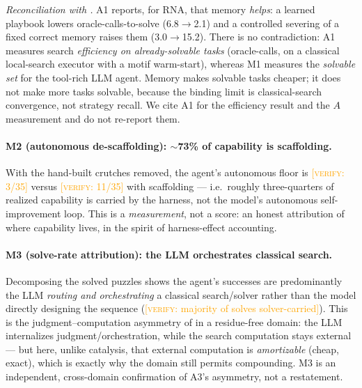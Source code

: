 \documentclass[11pt]{article}
\newcommand{\verify}[1]{\textcolor{orange}{[\textsc{verify}: #1]}}
\begin{document}
\emph{Reconciliation with \citet{actuation}.} A1 reports, for RNA, that memory \emph{helps}: a
learned playbook lowers oracle-calls-to-solve (6.8$\to$2.1) and a controlled severing of a fixed
correct memory raises them (3.0$\to$15.2). There is no contradiction: A1 measures search
\emph{efficiency on already-solvable tasks} (oracle-calls, on a classical local-search executor with a
motif warm-start), whereas M1 measures the \emph{solvable set} for the tool-rich LLM agent. Memory
makes solvable tasks cheaper; it does not make more tasks solvable, because the binding limit is
classical-search convergence, not strategy recall. We cite A1 for the efficiency result and the $A$
measurement and do not re-report them.

\paragraph{M2 (autonomous de-scaffolding): $\sim$73\% of capability is scaffolding.} With the
hand-built crutches removed, the agent's autonomous floor is \verify{3/35} versus \verify{11/35} with
scaffolding --- i.e.\ roughly three-quarters of realized capability is carried by the harness, not the
model's autonomous self-improvement loop. This is a \emph{measurement}, not a score: an honest
attribution of where capability lives, in the spirit of harness-effect accounting.

\paragraph{M3 (solve-rate attribution): the LLM orchestrates classical search.} Decomposing the
solved puzzles shows the agent's successes are predominantly the LLM \emph{routing and orchestrating}
a classical search/solver rather than the model directly designing the sequence
(\verify{majority of solves solver-carried}). This is the judgment--computation asymmetry of
\citet{oracleresidue} in a residue-free domain: the LLM internalizes judgment/orchestration, while
the search computation stays external --- but here, unlike catalysis, that external computation is
\emph{amortizable} (cheap, exact), which is exactly why the domain still permits compounding. M3 is an
independent, cross-domain confirmation of A3's asymmetry, not a restatement.
\end{document}
